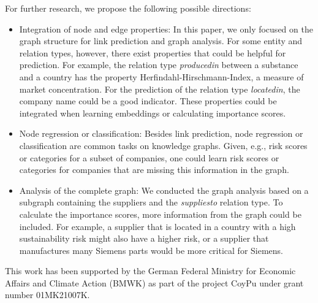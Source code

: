 \documentclass[
]{ceurart}
\begin{document}
For further research, we propose the following possible directions:
\begin{itemize}
    \item Integration of node and edge properties: In this paper, we only focused on the graph structure for link prediction and graph analysis. For some entity and relation types, however, there exist properties that could be helpful for prediction.
    For example, the relation type \textit{produced\textunderscore in} between a substance and a country has the property Herfindahl-Hirschmann-Index, a measure of market concentration. For the prediction of the relation type \textit{located\textunderscore in}, the company name could be a good indicator. 
    These properties could be integrated when learning embeddings or calculating importance scores. 
    \item Node regression or classification: Besides link prediction, node regression or classification are common tasks on knowledge graphs. Given, e.g., risk scores or categories for a subset of companies, one could learn risk scores or categories for companies that are missing this information in the graph.
    \item Analysis of the complete graph: We conducted the graph analysis based on a subgraph containing the suppliers and the \textit{supplies\textunderscore to} relation type. 
    To calculate the importance scores, more information from the graph could be included. For example, a supplier that is located in a country with a high sustainability risk might also have a higher risk, or a supplier that manufactures many Siemens parts would be more critical for Siemens.  
\end{itemize}


\begin{acknowledgments}
This work has been supported by the German Federal Ministry for Economic Affairs and Climate Action (BMWK) as part of the project CoyPu under grant number 01MK21007K.
\end{acknowledgments}



\end{document}
